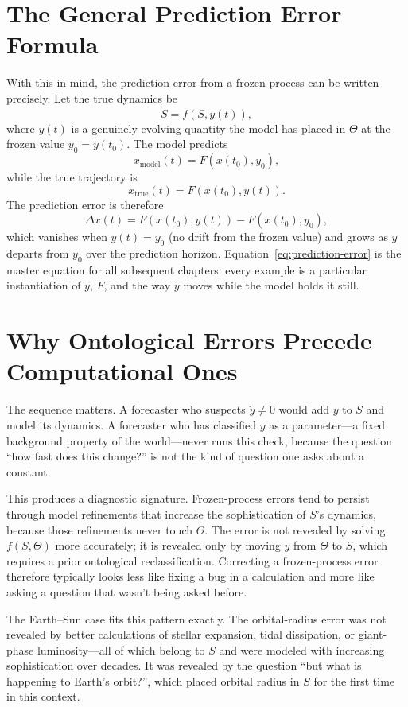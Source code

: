 \documentclass[11pt]{book}
\theoremstyle{plain}
\theoremstyle{definition}
\theoremstyle{remark}
\begin{document}
\section{The General Prediction Error Formula}

With this in mind, the prediction error from a frozen process can be written precisely. Let the true dynamics be
\[
\dot S = f(S, y(t)),
\]
where $y(t)$ is a genuinely evolving quantity the model has placed in $\Theta$ at the frozen value $y_0 = y(t_0)$. The model predicts
\[
x_{\mathrm{model}}(t) = F(x(t_0), y_0),
\]
while the true trajectory is
\[
x_{\mathrm{true}}(t) = F(x(t_0), y(t)).
\]
The prediction error is therefore
\begin{equation}
\Delta x(t) = F(x(t_0), y(t)) - F(x(t_0), y_0),
\label{eq:prediction-error}
\end{equation}
which vanishes when $y(t) = y_0$ (no drift from the frozen value) and grows as $y$ departs from $y_0$ over the prediction horizon. Equation~\eqref{eq:prediction-error} is the master equation for all subsequent chapters: every example is a particular instantiation of $y$, $F$, and the way $y$ moves while the model holds it still.

\section{Why Ontological Errors Precede Computational Ones}

The sequence matters. A forecaster who suspects $\dot y \ne 0$ would add $y$ to $S$ and model its dynamics. A forecaster who has classified $y$ as a parameter---a fixed background property of the world---never runs this check, because the question ``how fast does this change?'' is not the kind of question one asks about a constant.

This produces a diagnostic signature. Frozen-process errors tend to persist through model refinements that increase the sophistication of $S$'s dynamics, because those refinements never touch $\Theta$. The error is not revealed by solving $f(S,\Theta)$ more accurately; it is revealed only by moving $y$ from $\Theta$ to $S$, which requires a prior ontological reclassification. Correcting a frozen-process error therefore typically looks less like fixing a bug in a calculation and more like asking a question that wasn't being asked before.

The Earth--Sun case fits this pattern exactly. The orbital-radius error was not revealed by better calculations of stellar expansion, tidal dissipation, or giant-phase luminosity---all of which belong to $S$ and were modeled with increasing sophistication over decades. It was revealed by the question ``but what is happening to Earth's orbit?'', which placed orbital radius in $S$ for the first time in this context.
\end{document}
